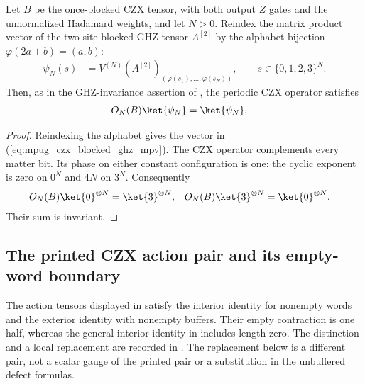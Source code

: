 \begin{lemma}
    \label{thm:mpug_czx_blocked_ghz_invariant}
    \leanok
    Let $B$ be the once-blocked CZX tensor, with both output $Z$ gates and
    the unnormalized Hadamard weights, and let $N>0$.
    Reindex the matrix product vector of the two-site-blocked GHZ tensor
    $A^{[2]}$ by the alphabet bijection $\varphi(2a+b)=(a,b)$:
    \begin{align}
        \psi_N(s) & =V^{(N)}(A^{[2]})_{(\varphi(s_1),\ldots,\varphi(s_N))},
        \qquad s\in\{0,1,2,3\}^N.
    \end{align}
    Then, as in the GHZ-invariance assertion of
    \cite[lines~4660--4670]{FrancoRubio2025MPUGauging}, the periodic CZX
    operator satisfies
    \begin{align}
        O_N(B)\ket{\psi_N} & =\ket{\psi_N}.
    \end{align}
\end{lemma}

\begin{proof}\leanok
    Reindexing the alphabet gives the vector in
    (\ref{eq:mpug_czx_blocked_ghz_mpv}). The CZX operator complements
    every matter bit. Its phase on either constant configuration is one:
    the cyclic exponent is zero on $0^N$ and $4N$ on $3^N$.
    Consequently
    \begin{align}
        O_N(B)\ket{0}^{\otimes N} & =\ket{3}^{\otimes N}, &
        O_N(B)\ket{3}^{\otimes N} & =\ket{0}^{\otimes N}.
    \end{align}
    Their sum is invariant.
\end{proof}

\subsection{The printed CZX action pair and its empty-word boundary}

The action tensors displayed in
\cite[lines~4690--4694]{FrancoRubio2025MPUGauging} satisfy the interior
identity for nonempty words and the exterior identity with nonempty buffers.
Their empty contraction is one half, whereas the general interior identity
in \cite[lines~1841--1870]{FrancoRubio2025MPUGauging} includes length zero.
The distinction and a local replacement are recorded in
\cite{gap:fbc25_czx_action_empty_word}. The replacement below is a different
pair, not a scalar gauge of the printed pair or a substitution in the
unbuffered defect formulas.

